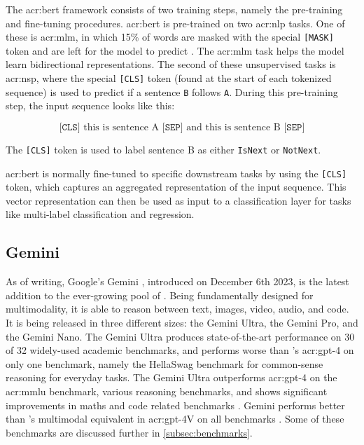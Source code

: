 The \acrshort{acr:bert} framework consists of two training steps, namely the pre-training and fine-tuning procedures. \acrshort{acr:bert} is pre-trained on two \gls{acr:nlp} tasks. One of these is \gls{acr:mlm}, in which 15\% of words are masked with the special \texttt{[MASK]} token and are left for the model to predict \citep[4]{devlinBERTPretrainingDeep2019}. The \gls{acr:mlm} task helps the model learn bidirectional representations. The second of these unsupervised tasks is \gls{acr:nsp}, where the special \texttt{[CLS]} token (found at the start of each tokenized sequence) is used to predict if a sentence \texttt{B} follows \texttt{A}. During this pre-training step, the input sequence looks like this:

$$
    \texttt{[CLS]} \text{ this is sentence A } \texttt{[SEP]} \text{ and this is sentence B } \texttt{[SEP]}
$$

\noindent The \texttt{[CLS]} token is used to label sentence B as either \texttt{IsNext} or \texttt{NotNext}.

\acrshort{acr:bert} is normally fine-tuned to specific downstream tasks by using the \texttt{[CLS]} token, which captures an aggregated representation of the input sequence. This vector representation can then be used as input to a classification layer for tasks like multi-label classification and regression.

\subsection{Gemini}\label{subsec:gemini}

As of writing, Google's Gemini \citep{geminiteamGeminiFamilyHighly2023}, introduced on December 6th 2023, is the latest addition to the ever-growing pool of . Being fundamentally designed for multimodality, it is able to reason between text, images, video, audio, and code. It is being released in three different sizes: the Gemini Ultra, the Gemini Pro, and the Gemini Nano. The Gemini Ultra produces state-of-the-art performance on 30 of 32 widely-used academic benchmarks, and performs worse than \citeauthor{openaiGPT4TechnicalReport2023}'s \acrshort{acr:gpt}-4 on only one benchmark, namely the HellaSwag benchmark for common-sense reasoning for everyday tasks. The Gemini Ultra outperforms \acrshort{acr:gpt}-4 on the \gls{acr:mmlu} benchmark, various reasoning benchmarks, and shows significant improvements in maths and code related benchmarks  \citep[7]{geminiteamGeminiFamilyHighly2023}. Gemini performs better than \citeauthor{openaiGPT4TechnicalReport2023}'s multimodal equivalent in \acrshort{acr:gpt}-4V on all benchmarks \citep[12]{geminiteamGeminiFamilyHighly2023}. Some of these benchmarks are discussed further in \autoref{subsec:benchmarks}.

